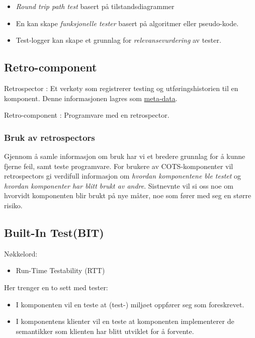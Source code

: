 \begin{itemize}
\item
  \emph{Round trip path test} basert på tilstandsdiagrammer
\item
  En kan skape \emph{funksjonelle tester} basert på algoritmer eller
  pseudo-kode.
\item
  Test-logger kan skape et grunnlag for \emph{relevansevurdering} av
  tester.
\end{itemize}
\subsection{Retro-component}

Retrospector : Et verkøty som registrerer testing og utføringshistorien
til en komponent. Denne informasjonen lagres som
\href{\#componentmeta-data}{meta-data}.

Retro-component : Programvare med en retrospector.

\subsubsection{Bruk av retrospectors}

Gjennom å samle informasjon om bruk har vi et bredere grunnlag for å
kunne fjerne feil, samt teste programvare. For brukere av
COTS-komponenter vil retrospectors gi verdifull informasjon om
\emph{hvordan komponentene ble testet} og \emph{hvordan komponenter har
blitt brukt av andre}. Sistnevnte vil si oss noe om hvorvidt komponenten
blir brukt på nye måter, noe som fører med seg en større risiko.

\subsection{Built-In Test(BIT)}

Nøkkelord:

\begin{itemize}
\item
  Run-Time Testability (RTT)
\end{itemize}
Her trenger en to sett med tester:

\begin{itemize}
\item
  I komponenten vil en teste at (test-) miljøet oppfører seg som
  foreskrevet.
\item
  I komponentens klienter vil en teste at komponenten implementerer de
  semantikker som klienten har blitt utviklet for å forvente.
\end{itemize}
